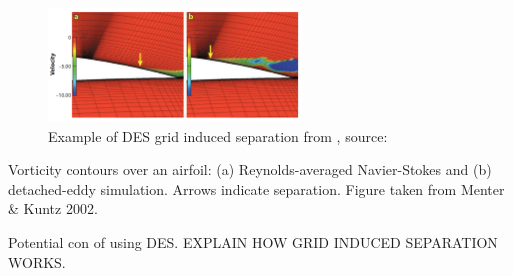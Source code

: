 \documentclass[journal]{new-aiaa}
\begin{document}
\begin{figure}[H]
\begin{center}
\includegraphics[width=0.6\textwidth]{Images/logan/spalart2009detachededdy_GridInducedSeparation.pdf}
\caption{ Example of DES grid induced separation from \cite{spalart2009detachededdy}, source: \cite{menter2004adaptation} }
\label{fig:desgridinducedseparation}
\end{center}
\end{figure}

Vorticity contours over an airfoil: (a) Reynolds-averaged Navier-Stokes and (b) detached-eddy simulation.
Arrows indicate separation. Figure taken from Menter \& Kuntz 2002.

Potential con of using DES. EXPLAIN HOW GRID INDUCED SEPARATION WORKS.



\end{document}
